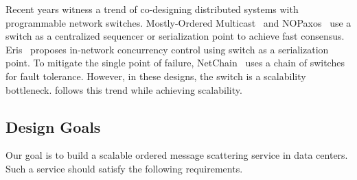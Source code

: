 Recent years witness a trend of co-designing distributed systems with programmable network switches.
Mostly-Ordered Multicast~\cite{ports2015designing} and NOPaxos~\cite{li2016just} use a switch as a centralized sequencer or serialization point to achieve fast consensus.
Eris~\cite{eris} proposes in-network concurrency control using switch as a serialization point.
To mitigate the single point of failure, NetChain~\cite{jin2018netchain} uses a chain of switches for fault tolerance.
However, in these designs, the switch is a scalability bottleneck.
\sys follows this trend while achieving scalability.




\subsection{Design Goals}
\label{sec:goals}

Our goal is to build a scalable ordered message scattering service in data centers. Such a service should satisfy the following requirements.


